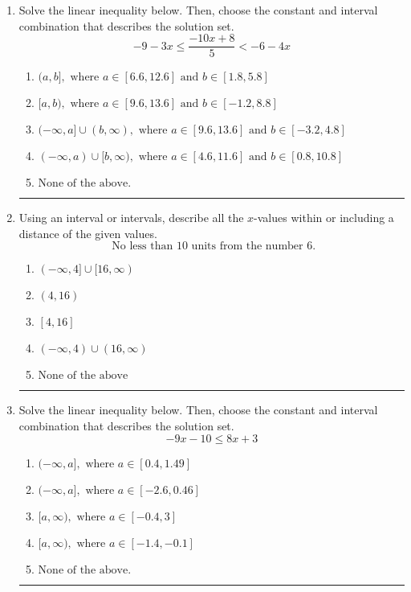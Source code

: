 \documentclass[14pt]{extbook}
\newcommand{\litem}[1]{\item#1\hspace*{-1cm}\rule{\textwidth}{0.4pt}}
\begin{document}
\begin{enumerate}
\litem{
Solve the linear inequality below. Then, choose the constant and interval combination that describes the solution set.\[ -9 - 3 x \leq \frac{-10 x + 8}{5} < -6 - 4 x \]\begin{enumerate}[label=\Alph*.]
\item \( (a, b], \text{ where } a \in [6.6, 12.6] \text{ and } b \in [1.8, 5.8] \)
\item \( [a, b), \text{ where } a \in [9.6, 13.6] \text{ and } b \in [-1.2, 8.8] \)
\item \( (-\infty, a] \cup (b, \infty), \text{ where } a \in [9.6, 13.6] \text{ and } b \in [-3.2, 4.8] \)
\item \( (-\infty, a) \cup [b, \infty), \text{ where } a \in [4.6, 11.6] \text{ and } b \in [0.8, 10.8] \)
\item \( \text{None of the above.} \)

\end{enumerate} }
\litem{
Using an interval or intervals, describe all the $x$-values within or including a distance of the given values.\[ \text{ No less than } 10 \text{ units from the number } 6. \]\begin{enumerate}[label=\Alph*.]
\item \( (-\infty, 4] \cup [16, \infty) \)
\item \( (4, 16) \)
\item \( [4, 16] \)
\item \( (-\infty, 4) \cup (16, \infty) \)
\item \( \text{None of the above} \)

\end{enumerate} }
\litem{
Solve the linear inequality below. Then, choose the constant and interval combination that describes the solution set.\[ -9x -10 \leq 8x + 3 \]\begin{enumerate}[label=\Alph*.]
\item \( (-\infty, a], \text{ where } a \in [0.4, 1.49] \)
\item \( (-\infty, a], \text{ where } a \in [-2.6, 0.46] \)
\item \( [a, \infty), \text{ where } a \in [-0.4, 3] \)
\item \( [a, \infty), \text{ where } a \in [-1.4, -0.1] \)
\item \( \text{None of the above}. \)


\end{enumerate}}
\end{enumerate}
\end{document}
